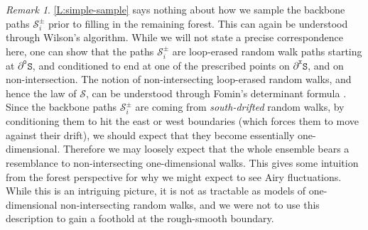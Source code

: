 \documentclass[11pt,twoside]{amsart}
\theoremstyle{plain}
\numberwithin{quest}{section}
\theoremstyle{remark}
\newtheorem{rem}{Remark}
\numberwithin{rem}{section}
\theoremstyle{definition}
\newcommand{\cS}{\mathcal{S}}
\renewcommand{\tt}[1]{{\mathtt{#1}}}
\begin{document}
	\begin{rem}
		\label{R:fomin}
		\cref{L:simple-sample} says nothing about how we sample the backbone paths $\cS_i^\pm$ prior to filling in the remaining forest. This can again be understood through Wilson's algorithm. While we will not state a precise correspondence here, one can show that the paths $\cS_i^\pm$ are loop-erased random walk paths starting at $\partial^\tt{o} \tt{S}$, and conditioned to end at one of the prescribed points on $\partial^\tt{x} \tt{S}$, and on non-intersection. The notion of non-intersecting loop-erased random walks, and hence the law of $\cS$, can be understood through Fomin's determinant formula \cite{fomin2001loop}. Since the backbone paths $\cS_i^\pm $ are coming from \emph{south-drifted} random walks, by conditioning them to hit the east or west boundaries (which forces them to move against their drift), we should expect that they become essentially one-dimensional. Therefore we may loosely expect that the whole ensemble bears a resemblance to non-intersecting one-dimensional walks. This gives some intuition from the forest perspective for why we might expect to see Airy fluctuations. While this is an intriguing picture, it is not as tractable as models of one-dimensional non-intersecting random walks, and we were not to use this description to gain a foothold at the rough-smooth boundary.
	\end{rem}
	
\end{document}
